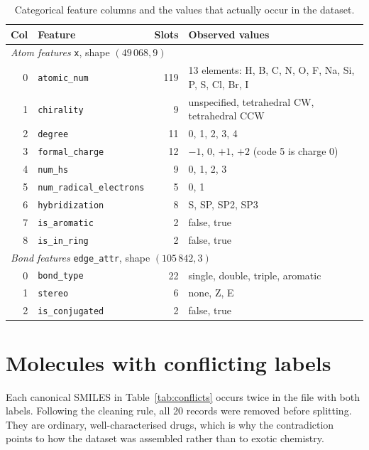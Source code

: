 \documentclass[10pt]{article}
\begin{document}
\begin{table}[H]
    \centering
    \caption{Categorical feature columns and the values that actually occur in the dataset.}
    \label{tab:vocab}
    \footnotesize
    \setlength{\tabcolsep}{5pt}
    \begin{tabular}{rlrp{}}
        \toprule
        Col & Feature & Slots & Observed values \\
        \midrule
        \multicolumn{4}{l}{\textit{Atom features} \texttt{x}, shape $(49\,068, 9)$} \\
        0 & \texttt{atomic\_num}      & 119 & 13 elements: H, B, C, N, O, F, Na, Si, P, S, Cl, Br, I \\
        1 & \texttt{chirality}        &   9 & unspecified, tetrahedral CW, tetrahedral CCW \\
        2 & \texttt{degree}           &  11 & 0, 1, 2, 3, 4 \\
        3 & \texttt{formal\_charge}   &  12 & $-1$, 0, $+1$, $+2$ (code 5 is charge 0) \\
        4 & \texttt{num\_hs}          &   9 & 0, 1, 2, 3 \\
        5 & \texttt{num\_radical\_electrons} & 5 & 0, 1 \\
        6 & \texttt{hybridization}    &   8 & S, SP, SP2, SP3 \\
        7 & \texttt{is\_aromatic}     &   2 & false, true \\
        8 & \texttt{is\_in\_ring}     &   2 & false, true \\
        \midrule
        \multicolumn{4}{l}{\textit{Bond features} \texttt{edge\_attr}, shape $(105\,842, 3)$} \\
        0 & \texttt{bond\_type}       &  22 & single, double, triple, aromatic \\
        1 & \texttt{stereo}           &   6 & none, Z, E \\
        2 & \texttt{is\_conjugated}   &   2 & false, true \\
        \bottomrule
    \end{tabular}
\end{table}

\section{Molecules with conflicting labels}
\label{app:conflicts}

Each canonical SMILES in Table~\ref{tab:conflicts} occurs twice in the file with both labels. Following the cleaning
rule, all 20 records were removed before splitting. They are ordinary, well-characterised drugs, which is why the
contradiction points to how the dataset was assembled rather than to exotic chemistry.
\end{document}
